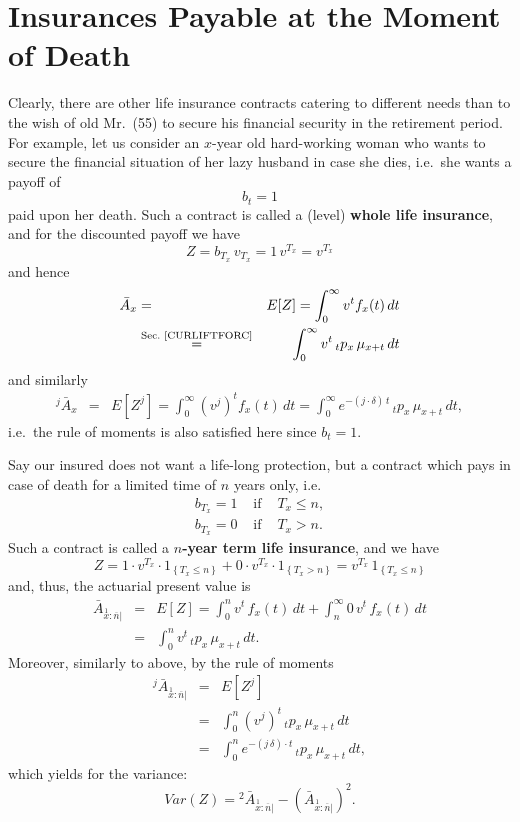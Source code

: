\documentclass[11pt,fleqn,oneside]{book}
\begin{document}
\section{Insurances Payable at the Moment of Death}
\label{SECINSTIMEOFDEATH}

Clearly, there are other life insurance contracts catering to different needs than to the wish of old Mr.\ (55) to secure his financial security in the retirement period. For example, let us consider an $x$-year old hard-working woman who wants to secure the financial situation of her lazy husband in case she dies, i.e.\ she wants a payoff of 
$$
b_t = 1
$$
paid upon her death. Such a contract is called a (level) \textbf{whole life insurance}, and for the discounted payoff we have
$$
Z = b_{T_x} \, v_{T_x} = 1\,v^{T_x} = v^{T_x}
$$
and hence
\begin{eqnarray*}
\bar{A}_x &=& E[Z]
= \int_0^{\infty} v^t f_{x}(t)\,dt \\
&\stackrel{\text{Sec.\ \ref{CURLIFTFORC}}}{=}& \int_0^{\infty} v^t\,{_tp_x} \, \mu_{x+t}\,dt
\end{eqnarray*}
and similarly
\begin{eqnarray*}
{^j\bar{A}_x} &=& E\left[Z^j\right]
= \int_0^{\infty} \left(v^j\right)^t f_{x}(t)\,dt 
= \int_0^{\infty} e^{-(j\cdot \delta)\,t}\,{_tp_x} \, \mu_{x+t}\,dt,
\end{eqnarray*}
i.e.\ the rule of moments is also satisfied here since $b_t=1$. 

Say our insured does not want a life-long protection, but a contract which pays in case of death for a limited time of $n$ years only, i.e.
\begin{eqnarray*}
b_{T_x} = 1 &\text{ if }& T_x \leq n, \\
b_{T_x} = 0 &\text{ if }& T_x > n.
\end{eqnarray*}
Such a contract is called a \textbf{$n$-year term life insurance}, and we have 
$$
Z = 1\cdot v^{T_x} \cdot 1_{\left\{T_x\leq n\right\}} + 0\cdot v^{T_x}\cdot  1_{\left\{T_x > n\right\}} = v^{T_x} \, 1_{\left\{T_x\leq n\right\}}$$
and, thus, the actuarial present value is 
\begin{eqnarray*}
{\bar{A}_{\stackrel{1}{x}:\overline{n}|}} &=& E[Z] = \int_0^n v^t\, f_{x}(t)\,dt + \int_n^{\infty} 0\,v^t\,f_{x}(t)\,dt\\
&=& \int_0^n v^t \,{_tp_x}\,{\mu_{x+t}}\,dt.
\end{eqnarray*}
Moreover, similarly to above, by the rule of moments 
\begin{eqnarray*}
{^j\bar{A}_{\stackrel{1}{x}:\overline{n}|}} &=& E[Z^j]\\
&=& \int_0^n \left(v^j\right)^t \,{_tp_x}\,{\mu_{x+t}}\,dt \\
&=& \int_0^n e^{-(j\,\delta)\cdot t} \,{_tp_x}\,{\mu_{x+t}}\,dt,
\end{eqnarray*}
which yields for the variance:
$$
Var(Z) = {^2\bar{A}_{\stackrel{1}{x}:\overline{n}|}} - \left({\bar{A}_{\stackrel{1}{x}:\overline{n}|}}\right)^2.
$$
\end{document}
